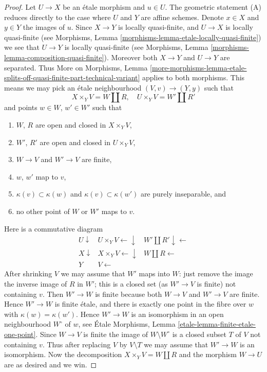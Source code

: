 \begin{proof}
Let $U \to X$ be an \'etale morphism and $u \in U$.
The geometric statement (A) reduces directly to the case where $U$ and $Y$
are affine schemes. Denote $x \in X$ and $y \in Y$ the
images of $u$. Since $X \to Y$ is locally quasi-finite, and $U \to X$ is
locally quasi-finite (see
Morphisms, Lemma \ref{morphisms-lemma-etale-locally-quasi-finite})
we see that $U \to Y$ is locally quasi-finite (see
Morphisms, Lemma \ref{morphisms-lemma-composition-quasi-finite}).
Moreover both $X \to Y$ and $U \to Y$ are separated. Thus
More on Morphisms, Lemma
\ref{more-morphisms-lemma-etale-splits-off-quasi-finite-part-technical-variant}
applies to both morphisms. This means we may pick an \'etale neighbourhood
$(V, v) \to (Y, y)$ such that
$$
X \times_Y V = W \amalg R, \quad
U \times_Y V = W' \amalg R'
$$
and points $w \in W$, $w' \in W'$ such that
\begin{enumerate}
\item $W$, $R$ are open and closed in $X \times_Y V$,
\item $W'$, $R'$ are open and closed in $U \times_Y V$,
\item $W \to V$ and $W' \to V$ are finite,
\item $w$, $w'$ map to $v$,
\item $\kappa(v) \subset \kappa(w)$ and $\kappa(v) \subset \kappa(w')$
are purely inseparable, and
\item no other point of $W$ or $W'$ maps to $v$.
\end{enumerate}
Here is a commutative diagram
$$
\begin{array}{ccc}U \downarrow & U \times_Y V \longleftarrow\downarrow & W' \amalg R' \downarrow\longleftarrow \\ X \downarrow & X \times_Y V \longleftarrow\downarrow & W \amalg R \longleftarrow \\ Y & V \longleftarrow & \end{array}
$$
After shrinking $V$ we may assume that $W'$ maps into $W$:
just remove the image the inverse image of $R$ in $W'$; this is
a closed set (as $W' \to V$ is finite) not containing $v$.
Then $W' \to W$ is finite because both $W \to V$ and $W' \to V$ are finite.
Hence $W' \to W$ is finite \'etale, and there is exactly one point in the
fibre over $w$ with $\kappa(w) = \kappa(w')$. Hence $W' \to W$ is an
isomorphism in an open neighbourhood $W^\circ$ of $w$, see
\'Etale Morphisms, Lemma \ref{etale-lemma-finite-etale-one-point}.
Since $W \to V$ is finite the image of $W \setminus W^\circ$ is a closed
subset $T$ of $V$ not containing $v$. Thus after replacing $V$ by
$V \setminus T$ we may assume that $W' \to W$ is an isomorphism.
Now the decomposition $X \times_Y V = W \amalg R$ and the morphism
$W \to U$ are as desired and we win.
\end{proof}

